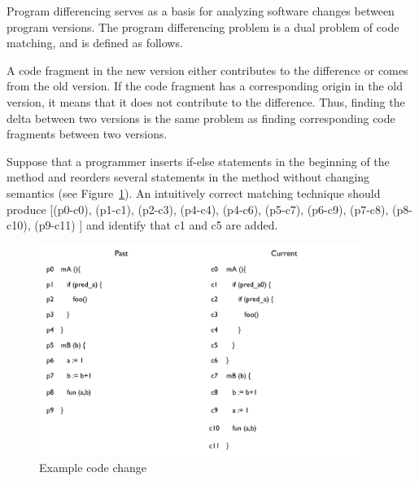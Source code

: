 Program differencing serves as a basis for analyzing software changes between program versions. The program differencing problem is a dual problem of code matching, and is defined as follows. 
 

A code fragment in the new version either contributes to the difference or comes from the old version. If the code fragment has a corresponding origin in the old version, it means that it does not contribute to the difference. Thus, finding the delta between two versions is the same problem as finding corresponding code fragments between two versions. 

Suppose that a programmer inserts if-else statements in the beginning of the method  and reorders several statements in the method  without changing semantics (see Figure~\ref{fig:changeexample}). An intuitively correct matching technique should produce [(p0-c0), (p1-c1), (p2-c3), (p4-c4), (p4-c6), (p5-c7), (p6-c9), (p7-c8), (p8-c10), (p9-c11) ] and identify that c1 and c5 are added.  

\begin{figure}
\centering
\includegraphics[width=0.95\textwidth]{images/DifferencingExample.pdf}
\caption{Example code change}
\label{fig:changeexample} 
\end{figure}

